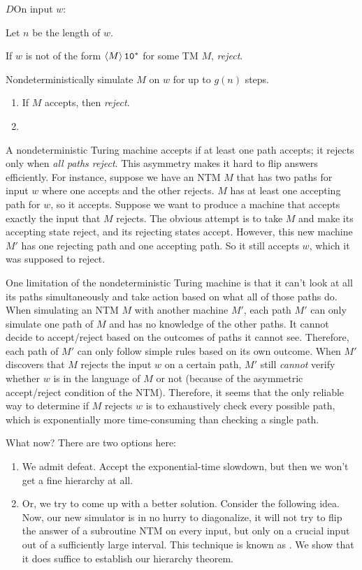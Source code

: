\documentclass[11pt,twoside=off,numbers=noenddot]{scrbook}
\begin{document}
\begin{turing}{$D$}{On input $w$:}
\item Let $n$ be the length of $w$.
\item If $w$ is not of the form $\left< M \right>\texttt{1}\texttt{0}^\ast$ for some TM $M$, \emph{reject}.
\item Nondeterministically simulate $M$ on $w$ for up to $g(n)$ steps.
  \begin{enumerate}[label=\theenumi.\arabic*.]
    \item If $M$ accepts, then \emph{reject}.
    \item {}
  \end{enumerate}
\end{turing}

A nondeterministic Turing machine accepts if at least one path accepts; it rejects only when \emph{all paths reject}. This asymmetry makes it hard to flip answers efficiently. For instance, suppose we have an NTM $M$ that has two paths for input $w$ where one accepts and the other rejects. $M$ has at least one accepting path for $w$, so it accepts. Suppose we want to produce a machine that accepts exactly the input that $M$ rejects. The obvious attempt is to take $M$ and make its accepting state reject, and its rejecting states accept. However, this new machine $M'$ has one rejecting path and one accepting path. So it still accepts $w$, which it was supposed to reject.

One limitation of the nondeterministic Turing machine is that it can't look at all its paths simultaneously and take action based on what all of those paths do. When simulating an NTM $M$ with another machine $M'$, each path $M'$ can only simulate one path of $M$ and has no knowledge of the other paths. It cannot decide to accept/reject based on the outcomes of paths it cannot see. Therefore, each path of $M'$ can only follow simple rules based on its own outcome. When $M'$ discovers that $M$ rejects the input $w$ on a certain path, $M'$ still \emph{cannot} verify whether $w$ is in the language of $M$ or not (because of the asymmetric accept/reject condition of the NTM). Therefore, it seems that the only reliable way to determine if $M$ rejects $w$ is to exhaustively check every possible path, which is exponentially more time-consuming than checking a single path.

What now? There are two options here:
\begin{enumerate}
  \item We admit defeat. Accept the exponential-time slowdown, but then we won't get a fine hierarchy at all.
  \item Or, we try to come up with a better solution. Consider the following idea. Now, our new simulator is in no hurry to diagonalize, it will not try to flip the answer of a subroutine NTM on every input, but only on a crucial input out of a sufficiently large interval. This technique is known as . We show that it does suffice to establish our hierarchy theorem.
\end{enumerate}
\end{document}
